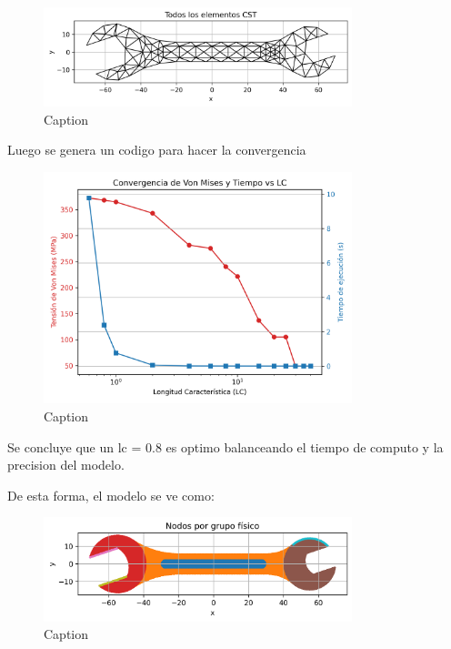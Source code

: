 \documentclass{article}  %
\begin{document}
\begin{figure}[H]
  \centering
  \includegraphics[width=0.8\textwidth]{GRAFICOS/Initial_elementos.png}
  \caption{Caption}
  \label{fig:deformed_shape}
\end{figure}

Luego se genera un codigo para hacer la convergencia

\begin{figure}[H]
  \centering
  \includegraphics[width=0.8\textwidth]{GRAFICOS/convergencia.png}
  \caption{Caption}
  \label{fig:wrench}
\end{figure}

Se concluye que un lc = 0.8 es optimo balanceando el tiempo de computo y la precision del modelo. 

De esta forma, el modelo se ve como:

\begin{figure}[H]
  \centering
  \includegraphics[width=0.8\textwidth]{GRAFICOS/Case a_nodes_por_grupo.png}
  \caption{Caption}
  \label{fig:wrench}
\end{figure}
\end{document}
